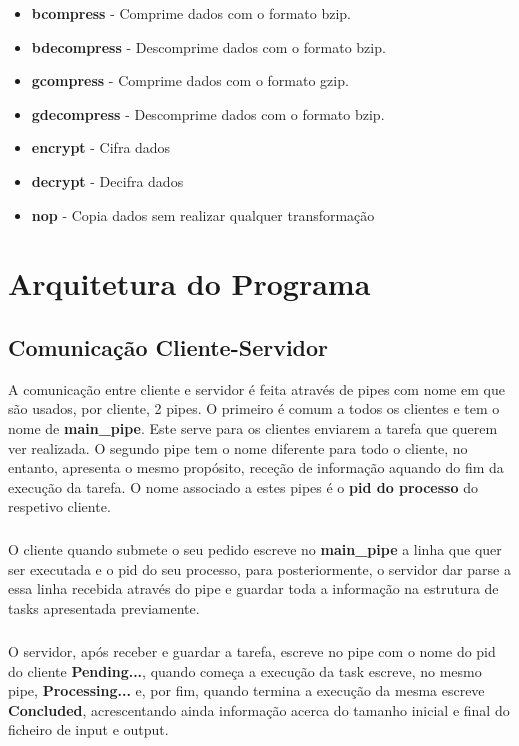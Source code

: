 \documentclass[11pt,a4paper]{report}
\begin{document}
    \begin{itemize}
    \item \textbf{bcompress} - Comprime dados com o formato bzip.
    \item \textbf{bdecompress} - Descomprime dados com o formato bzip.
    \item \textbf{gcompress} - Comprime dados com o formato gzip.
    \item \textbf{gdecompress} - Descomprime dados com o formato bzip.
    \item \textbf{encrypt} - Cifra dados
    \item \textbf{decrypt} - Decifra dados
    \item \textbf{nop} - Copia dados sem realizar qualquer transformação
    \end{itemize}
    
    \chapter{Arquitetura do Programa}
    \section{Comunicação Cliente-Servidor}
    A comunicação entre cliente e servidor é feita através de pipes com nome em que são usados, por cliente, 2 pipes. O primeiro é comum a todos os clientes e tem o nome de \textbf{main\_pipe}. Este serve para os clientes enviarem a tarefa que querem ver realizada. O segundo pipe tem o nome diferente para todo o cliente, no entanto, apresenta o mesmo propósito, receção de informação aquando do fim da execução da tarefa. O nome associado a estes pipes é o \textbf{pid do processo} do respetivo cliente.
    \paragraph{}
    O cliente quando submete o seu pedido escreve no \textbf{main\_pipe} a linha que quer ser executada e o pid do seu processo, para posteriormente, o servidor dar parse a essa linha recebida através do pipe e guardar toda a informação na estrutura de tasks apresentada previamente. 
    \paragraph{}
    O servidor, após receber e guardar a tarefa, escreve no pipe com o nome do pid do cliente \textbf{Pending...}, quando começa a execução da task escreve, no mesmo pipe, \textbf{Processing...} e, por fim, quando termina a execução da mesma escreve \textbf{Concluded}, acrescentando ainda informação acerca do tamanho inicial e final do ficheiro de input e output.
    
\end{document}
